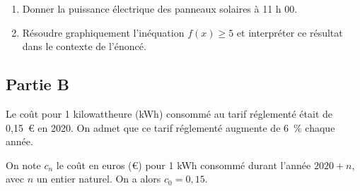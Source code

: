 \begin{enumerate}
	\item Donner la puissance électrique des panneaux solaires à 11 h 00.

	\item Résoudre graphiquement l'inéquation \quad $f(x) \geqslant 5$ \quad et interpréter ce résultat dans le contexte de l'énoncé.
\end{enumerate}

\subsection*{Partie B}
Le coût pour 1 kilowattheure (kWh) consommé au tarif réglementé était de 0,15~\euro{} en 2020. On admet que ce tarif réglementé augmente de 6~\% chaque année.

On note $c_{n}$ le coût en euros (\euro{}) pour 1 kWh consommé durant l'année $2020+n$, avec $n$ un entier naturel. On a alors $c_{0}=0,15$.

